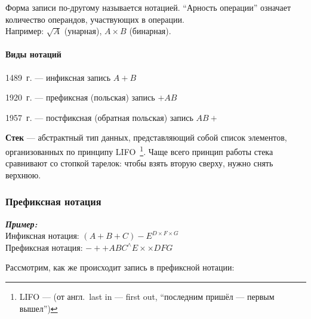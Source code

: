 Форма записи по-другому называется нотацией.
\enquote{Арность операции} означает количество операндов, участвующих в операции.\\
Например: $\sqrt{A}$ (унарная), $A \times B$ (бинарная).

\paragraph{Виды нотаций}\label{par:math-notations-types}
\begin{description}[style=standard]
    \item 1489~г. --- инфиксная запись $A + B$
    \item 1920~г. --- префиксная (польская) запись $+AB$
    \item 1957~г. --- постфиксная (обратная польская) запись $AB+$
\end{description}

\textbf{Стек} --- абстрактный тип данных, представляющий собой список элементов, организованных по принципу LIFO~\footnote{LIFO --- (от англ.\ last in --- first out, \enquote{последним пришёл --- первым вышел})}.
Чаще всего принцип работы стека сравнивают со стопкой тарелок: чтобы взять вторую сверху, нужно снять верхнюю.

\subsubsection{Префиксная нотация}\label{subsubec:prefix-notation}

\noindent
\textbf{\emph{Пример:}} \\
Инфиксная нотация: $(A + B + C) - E^{D\times F\times G}$ \\
Префиксная нотация: $-++ABC^{\wedge}E\times\times DFG$

\bigskip\noindent
Рассмотрим, как же происходит запись в префиксной нотации:

